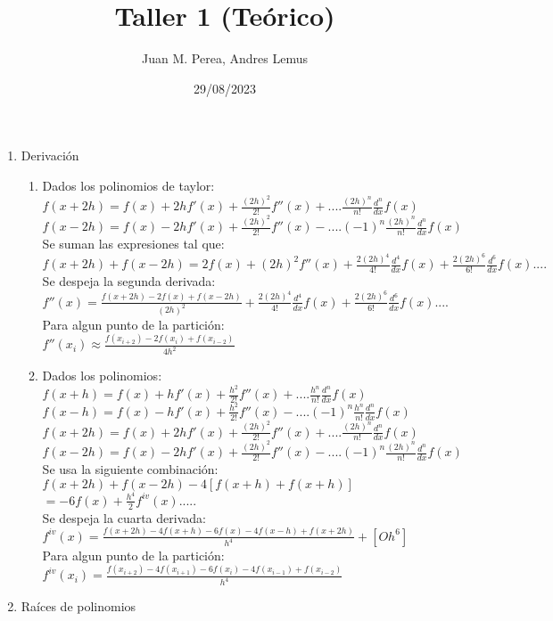 \documentclass{article}
\title{Taller 1 (Teórico)}
\author{Juan M. Perea, Andres Lemus}
\date{29/08/2023}
\begin{document}
\maketitle

\begin{enumerate}
\renewcommand{\theenumi}{\roman{enumi}}
\item Derivación
	\begin{enumerate}
	\renewcommand{\theenumii}{\arabic{enumii}}
	\item
		Dados los polinomios de taylor:\\
		$f(x+2h)=f(x)+2hf'(x)+\frac{(2h)^2}{2!}f''(x)+....\frac{(2h)^n}{n!}\frac{d^n}{dx}f(x)$\\
		$f(x-2h)=f(x)-2hf'(x)+\frac{(2h)^2}{2!}f''(x)-....(-1)^n\frac{(2h)^n}{n!}\frac{d^n}{dx}f(x)$\\
		Se suman las expresiones tal que:\\
		$f(x+2h)+f(x-2h)=2f(x)+(2h)^2f''(x)+\frac{2(2h)^4}{4!}\frac{d^4}{dx}f(x)+\frac{2(2h)^6}{6!}\frac{d^6}{dx}f(x)....$\\
		Se despeja la segunda derivada:\\
		$f''(x)=\frac{f(x+2h)-2f(x)+f(x-2h)}{(2h)^2}+\frac{2(2h)^4}{4!}\frac{d^4}{dx}f(x)+\frac{2(2h)^6}{6!}\frac{d^6}{dx}f(x)....$\\
		Para algun punto de la partición:\\
		$f''(x_i)\approx\frac{f(x_{i+2})-2f(x_i)+f(x_{i-2})}{4h^2}$
		\addtocounter{enumii}{3}
	\item 
		Dados los polinomios:\\
		$f(x+h)=f(x)+hf'(x)+\frac{h^2}{2!}f''(x)+....\frac{h^n}{n!}\frac{d^n}{dx}f(x)$\\
		$f(x-h)=f(x)-hf'(x)+\frac{h^2}{2!}f''(x)-....(-1)^n\frac{h^n}{n!}\frac{d^n}{dx}f(x)$\\
		$f(x+2h)=f(x)+2hf'(x)+\frac{(2h)^2}{2!}f''(x)+....\frac{(2h)^n}{n!}\frac{d^n}{dx}f(x)$\\
		$f(x-2h)=f(x)-2hf'(x)+\frac{(2h)^2}{2!}f''(x)-....(-1)^n\frac{(2h)^n}{n!}\frac{d^n}{dx}f(x)$\\
		Se usa la siguiente combinación:\\
		$f(x+2h)+f(x-2h)-4[f(x+h)+f(x+h)]$\\
		$=-6f(x)+\frac{h^4}{2}f^{iv}(x).....$\\
		Se despeja la cuarta derivada:\\
		$f^{iv}(x)=\frac{f(x+2h)-4f(x+h)-6f(x)-4f(x-h)+f(x+2h)}{h^4}+[Oh^6]$\\
		Para algun punto de la partición:\\
		$f^{iv}(x_i)=\frac{f(x_{i+2})-4f(x_{i+1})-6f(x_i)-4f(x_{i-1})+f(x_{i-2})}{h^4}$
	\end{enumerate}
\item Raíces de polinomios
\end{enumerate}
\end{document}
